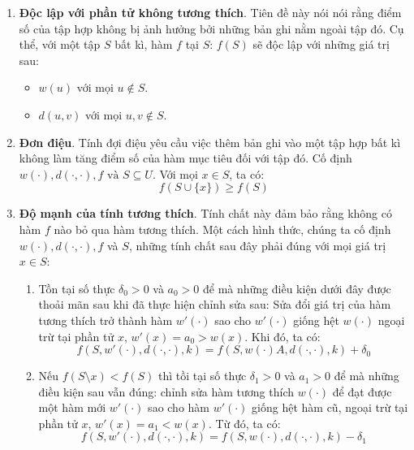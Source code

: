\documentclass[12pt]{report}
\begin{document}
\begin{enumerate}
    \item \textbf{Độc lập với phần tử không tương thích}. Tiên đề này nói
        nói rằng điểm số của tập hợp không bị ảnh hưởng bởi những bản ghi 
        nằm ngoài tập đó. Cụ thể, với một tập $S$ bất kì, hàm $f$ 
        tại $S$: $f(S)$ sẽ độc lập với những giá trị sau: 
        \begin{itemize}
            \item $w(u)$ với mọi $u \notin S$.
            \item $d(u, v)$ với mọi $u, v \notin S$.  
        \end{itemize}

    \item \textbf{Đơn điệu}. Tính đợi điệu yêu cầu việc thêm bản ghi vào 
        một tập hợp bất kì không làm tăng điểm số của hàm mục tiêu đối với 
        tập đó. Cố định $w(\cdot), d(\cdot, \cdot), f \text{ và } S \subseteq U$. 
        Với mọi $x \in S$, ta có: 
        $$f(S \cup \{x\}) \geq f(S)$$

    \item \textbf{Độ mạnh của tính tương thích}. Tính chất này đảm bảo
        rằng không có hàm $f$ nào bỏ qua hàm tương thích. Một cách hình 
        thức, chúng ta cố định $w(\cdot), d(\cdot, \cdot), f$ và $S$, những tính chất 
        sau đây phải đúng với mọi giá trị $x \in S$:
        \begin{enumerate}
            \item Tồn tại số thực $\delta_0 > 0$ 
                và $a_0 > 0$ để mà những điều
                kiện dưới đây được thoải mãn sau khi đã thực hiện chỉnh 
                sửa sau: Sửa đổi giá trị của hàm tương thích trở thành hàm 
                $w'(\cdot)$ sao cho $w'(\cdot)$ 
                giống hệt $w(\cdot)$ ngoại trừ tại phần
                tử $x$, $w'(x) = a_0 > w(x)$. Khi đó, ta có: 
                $$
                f(S, w'(\cdot), d(\cdot, \cdot), k) =
                f(S, w(\cdot)A, d(\cdot, \cdot), k) + \delta_0
                $$
            \item Nếu $f(S \setminus {x}) < f(S)$ thì tồi tại số thực 
                $\delta_1 > 0$ và $a_1 > 0$ để mà những điều kiện sau vẫn 
                đúng: chỉnh sửa hàm tương thích $w(\cdot)$ để đạt được một 
                hàm mới $w'(\cdot)$ sao cho hàm $w'(\cdot)$ giống hệt hàm 
                cũ, ngoại trừ tại phần tử $x$, $w'(x) = a_1 < w(x)$. 
                Từ đó, ta có: 
                $$
                    f(S, w'(\cdot), d(\cdot, \cdot), k) = 
                    f(S, w(\cdot), d(\cdot, \cdot), k) - \delta_1
                $$
        \end{enumerate}


\end{enumerate}
\end{document}
